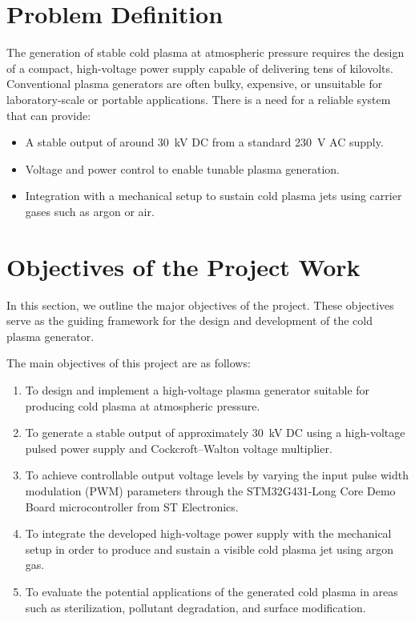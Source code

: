 \section{Problem Definition}
The generation of stable cold plasma at atmospheric pressure requires the design of a compact, high-voltage power supply capable of delivering tens of kilovolts. Conventional plasma generators are often bulky, expensive, or unsuitable for laboratory-scale or portable applications. There is a need for a reliable system that can provide:  
\begin{itemize}
    \item A stable output of around 30~kV DC from a standard 230~V AC supply.  
    \item Voltage and power control to enable tunable plasma generation.  
    \item Integration with a mechanical setup to sustain cold plasma jets using carrier gases such as argon or air.  
\end{itemize}

\section{Objectives of the Project Work}
In this section, we outline the major objectives of the project. These objectives serve as the guiding framework for the design and development of the cold plasma generator.

The main objectives of this project are as follows:

\begin{enumerate}
    \item To design and implement a high-voltage plasma generator suitable for producing cold plasma at atmospheric pressure.
    \item To generate a stable output of approximately 30~kV DC using a high-voltage pulsed power supply and Cockcroft–Walton voltage multiplier.
    \item To achieve controllable output voltage levels by varying the input pulse width modulation (PWM) parameters through the STM32G431-Long Core Demo Board microcontroller from ST Electronics.
    \item To integrate the developed high-voltage power supply with the mechanical setup in order to produce and sustain a visible cold plasma jet using argon gas.
    \item To evaluate the potential applications of the generated cold plasma in areas such as sterilization, pollutant degradation, and surface modification.
\end{enumerate}

